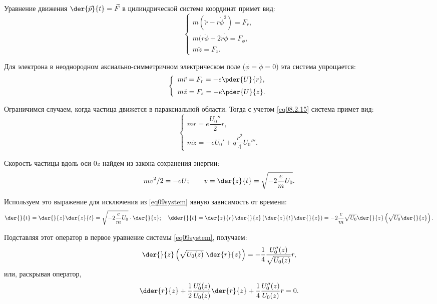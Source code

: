 
Уравнение движения
\( \displaystyle
  \der{\vec{p}}{t} = \vec{F}
\)
в цилиндрической системе координат примет вид:
\[
  \left\{
    \begin{array}{l}
      m(\ddot{r} - r\dot{\phi}^2) = F_r, \\
      m(r\ddot{\phi} + 2\dot{r}\dot{\phi} = F_\phi, \\
      m\ddot{z} = F_z.
    \end{array}
  \right.
\]

Для электрона в неоднородном аксиально-симметричном электрическом поле
(\( \dot{\phi} = \ddot{\phi} = 0 \)) эта система упрощается:
\[
  \left\{
    \begin{array}{l}
      \displaystyle m\ddot{r} = F_r = -e\pder{U}{r}, \\[.6em]
      \displaystyle m\ddot{z} = F_z = -e\pder{U}{z}.
    \end{array}
  \right.
\]

Ограничимся случаем, когда частица движется в параксиальной области. Тогда с
учетом \eqref{eq08.2.15} система примет вид:
\begin{equation}
  \left\{
    \begin{array}{l}
      m\ddot{r} = e\dfrac{U_0''}{2}r, \\
      m\ddot{z} = -eU_0' + q\dfrac{r^2}{4}U_0'''.
    \end{array}
  \right.
  \label{eq09system}
\end{equation}

Скорость частицы вдоль оси \( 0z \) найдем из закона сохранения энергии:
\[
  mv^2 / 2 = -eU; \qquad
    v = \der{z}{t} = \sqrt{-2\frac{e}{m}U_0}.
\]

Используем это выражение для исключения из \eqref{eq09system} явную зависимость
от времени:
\[
  \der{}{t} = \der{}{z}\der{z}{t} = \sqrt{-2\frac{e}{m}U_0}\cdot\der{}{z}; \quad
    \dder{}{t} = \der{z}{r}\der{}{z} \left( \der{z}{t}\der{}{z} \right) =
    -2\frac{e}{m}\sqrt{U_0}\der{}{z} \left( \sqrt{U_0}\der{}{z} \right).
\]

Подставляя этот оператор в первое уравнение системы \eqref{eq09system},
получаем:
\begin{equation}
  \der{}{z} \left( \sqrt{U_0(z)}\ \der{r}{z} \right) = -\frac{1}{4}
    \frac{U_0''(z)}{\sqrt{U_0(z)}} r,
  \label{eq09equation}
\end{equation}
или, раскрывая оператор,
\begin{equation}
  \dder{r}{z} + \frac{1}{2} \frac{U_0'(z)}{U_0(z)} \der{r}{z} + \frac{1}{4}
    \frac{U_0''(z)}{U_0(z)} r = 0.
  \label{eq09paraxial}
\end{equation}

